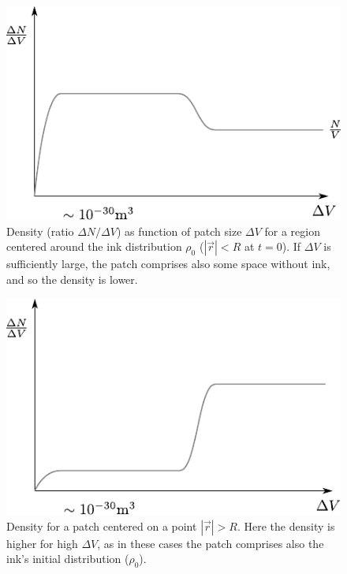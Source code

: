 \documentclass[../template.tex]{subfiles}
\begin{document}
\begin{minipage}[t]{0.45\textwidth}
\begin{figure}[H]
\includegraphics[width=\textwidth]{Plots/patch_centered_ink.pdf}
\caption{Density (ratio $\Delta N/\Delta V$) as function of patch size $\Delta V$ for a region centered around the ink distribution $\rho_0$ ($|\vec{r}|<R$ at $t=0$). If $\Delta V$ is sufficiently large, the patch comprises also some space without ink, and so the density is lower.}
\end{figure}
\end{minipage}\hfill%
\begin{minipage}[t]{0.45\textwidth}
\begin{figure}[H]
\includegraphics[width=\textwidth]{Plots/patch_centered_not_ink.pdf}
\caption{Density for a patch centered on a point $|\vec{r}|>R$. Here the density is higher for high $\Delta V$, as in these cases the patch comprises also the ink's initial distribution ($\rho_0$).}
\end{figure}
\end{minipage}
\end{document}
